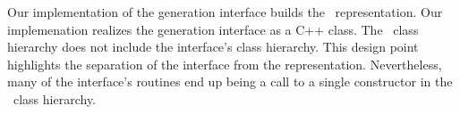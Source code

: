 Our implementation of the generation interface builds the \clef\
representation.  Our implemenation realizes the generation interface
as a C++ class.  The \clef\ class hierarchy does not include the
interface's class hierarchy.  This design point highlights the
separation of the interface from the representation.  Nevertheless,
many of the interface's routines end up being a call to a single
constructor in the \clef\ class hierarchy.





















